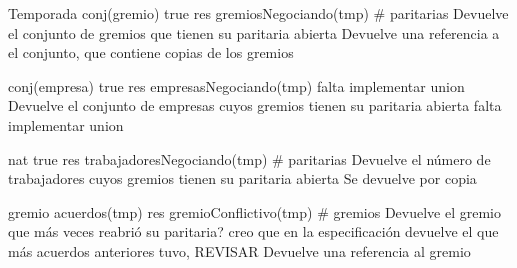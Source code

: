 \begin{interfaz}{Temporada}
{}{conj(gremio)}
{true}
{res \igobs gremiosNegociando(tmp)}
{\# paritarias}
{Devuelve el conjunto de gremios que tienen su paritaria abierta }
{Devuelve una referencia a el conjunto, que contiene copias de los gremios}

{}{conj(empresa)}
{true}
{res \igobs empresasNegociando(tmp)}
{falta implementar union}
{Devuelve el conjunto de empresas cuyos gremios tienen su paritaria abierta}
{falta implementar union}

{}{nat}
{true}
{res \igobs trabajadoresNegociando(tmp)}
{\# paritarias}
{Devuelve el número de trabajadores cuyos gremios tienen su paritaria abierta}
{Se devuelve por copia}

{}{gremio}
{\emptyset \neq acuerdos(tmp)}
{res \igobs gremioConflictivo(tmp)}
{\# gremios}
{Devuelve el gremio que más veces reabrió su paritaria? creo que en la especificación devuelve el que más acuerdos anteriores tuvo, REVISAR }
{Devuelve una referencia al gremio}


\end{interfaz}